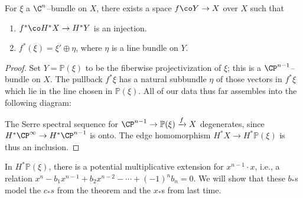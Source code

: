 \begin{lemma}
For $\xi$ a $\C^n$--bundle on $X$, there exists a space $f\co Y \to X$ over $X$ such that
\begin{enumerate}
    \item $f^*\co H^* X \to H^* Y$ is an injection.
    \item $f^*(\xi) = \xi' \oplus \eta$, where $\eta$ is a line bundle on $Y$.
\end{enumerate}
\end{lemma}
\begin{proof}
Set $Y = \mathbb P(\xi)$ to be the fiberwise projectivization of $\xi$; this is a $\CP^{n-1}$--bundle on $X$.  The pullback $f^* \xi$ has a natural subbundle $\eta$ of those vectors in $f^* \xi$ which lie in the line chosen in $\mathbb P(\xi)$.  All of our data thus far assembles into the following diagram:
\begin{center}
\end{center}
The Serre spectral sequence for $\CP^{n-1} \to \mathbb P(\xi) \xrightarrow f X$ degenerates, since $H^* \CP^\infty \to H^* \CP^{n-1}$ is onto.  The edge homomorphism $H^* X \to H^* \mathbb P(\xi)$ is thus an inclusion.
\end{proof}

\begin{remark}
In $H^* \mathbb P(\xi)$, there is a potential multiplicative extension for $x^{n-1} \cdot x$, i.e., a relation $x^n - b_1 x^{n-1} + b_2 x^{n-2} - \cdots + (-1)^n b_n = 0$.  We will show that these $b_*$s model the $c_*s$ from the theorem and the $x_*$s from last time.
\end{remark}

